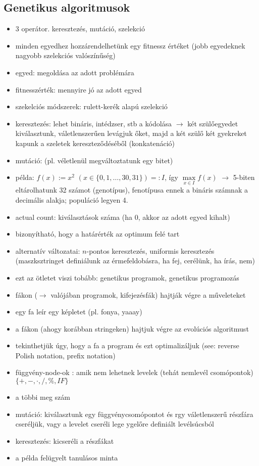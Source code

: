 \documentclass[a4paper, 11pt]{article}
\begin{document}
\subsection{Genetikus algoritmusok}

\begin{itemize}
	\item 3 operátor. keresztezés, mutáció, szelekció
	\item minden egyedhez hozzárendelhetünk egy fitnessz értéket (jobb egyedeknek nagyobb szelekciós valószínűség)
	\item egyed: megoldása az adott problémára
	\item fitnesszérték: mennyire jó az adott egyed
	\item szekelciós módszerek: rulett-kerék alapú szelekció
	\item keresztezés: lehet bináris, intédzser, stb a kódolása $\to$ két szülőegyedet kiválasztunk, váletlenszerűen levágjuk  őket, majd a két szülő két gyekreket kapunk a szeletek kereszteződéséből (konkatenáció)
	\item mutáció: (pl. véletlenül megváltoztatunk egy bitet)
	\item példa: $f(x) := x^2$ $(x \in \{ 0, 1, \dots, 30, 31 \}) =: I$, így $\max\limits_{x \in I} f(x)$ $\to$ 5-biten eltárolhatunk 32 számot (genotípus), fenotípusa ennek a bináris számnak a decimális alakja; populáció legyen 4.
	\item actual count: kiválasztások száma (ha 0, akkor az adott egyed kihalt)
	\item bizonyítható, hogy a határérték az optimum felé tart
	\item alternatív változatai: $n$-pontos keresztezés, uniformis keresztezés (maszksztringet definiálunk az érmefeldobásra, ha fej, cerélünk, ha írás, nem)
	\item ezt az ötletet viszi tobább: genetikus programok, genetikus programozás
	\item fákon ($\to$ valójában programok, kifejezésfák) hajtják végre a műveleteket
	\item egy fa leír egy képletet (pl. fonya, yaaay)
	\item a fákon (ahogy korábban stringeken) hajtjuk végre az evolúciós algoritmust
	\item tekinthetjük úgy, hogy a fa a program és ezt optimalizáljuk (see: reverse Polish notation, prefix notation)
	\item függvény-node-ok : amik nem lehetnek levelek (tehát nemlevél csomópontok) $\{+,-,\cdot,/,\%,IF\}$
	\item  a többi meg szám
	\item mutáció: kiválasztunk egy függvénycsomópontot és rgy váletlenszerű részfára cseréljük, vagy a levelet cseréli lege ygelőre definiált levélsúcsból
	\item keresztezés: kicseréli a részfákat
	\item a példa felügyelt tanulásos minta
\end{itemize}
\end{document}
